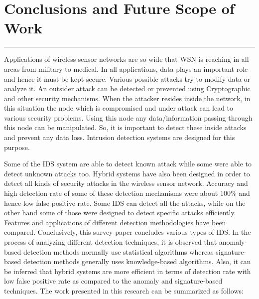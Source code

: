 \chapter{Conclusions and Future Scope of Work}
\label{C7} %
\noindent\rule{\linewidth}{2pt}
Applications of wireless sensor networks are so wide that WSN is reaching in all areas from military to medical. In all applications, data plays an important role and hence it must be kept secure. Various possible attacks try to modify data or analyze it. An outsider attack can be detected or prevented using Cryptographic and other security mechanisms. When the attacker resides inside the network, in this situation the node which is compromised and under attack can lead to various security problems. Using this node any data/information passing through this node can be manipulated. So, it is important to detect these inside attacks and prevent any data loss. Intrusion detection systems are designed for this purpose.
\par Some of the IDS system are able to detect known attack while some were able to detect unknown attacks too. Hybrid systems have also been designed in order to detect all kinds of security attacks in the wireless sensor network. Accuracy and high detection rate of some of these detection mechanisms were about 100\% and hence low false positive rate. Some IDS can detect all the attacks, while on the other hand some of those were designed to detect specific attacks efficiently. Features and applications of different detection methodologies have been compared. Conclusively, this survey paper concludes various types of IDS. In the process of analyzing different detection techniques, it is observed that anomaly-based detection methods normally use statistical algorithms whereas signature-based detection methods generally uses knowledge-based algorithms. Also, it can be inferred that hybrid systems are more efficient in terms of detection rate with low false positive rate as compared to the anomaly and signature-based techniques. The work presented in this research can be summarized as follows:
